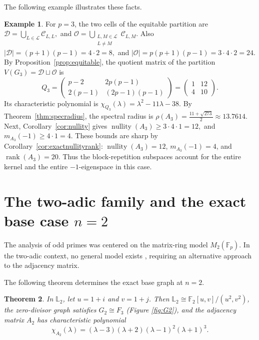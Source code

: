 \documentclass[12pt]{article}
\newtheorem{theorem}{Theorem}[section]
\theoremstyle{definition}
\newtheorem{example}[theorem]{Example}
\newcommand{\F}{\mathbb{F}}
\newcommand{\LL}{\mathbb{L}}
\newcommand{\calL}{\mathcal{L}}
\newcommand{\calD}{\mathcal{D}}
\newcommand{\calO}{\mathcal{O}}
\newcommand{\calC}{\mathcal{C}}
\newcommand{\rank}{\operatorname{rank}}
\newcommand{\nullity}{\operatorname{nullity}}
\begin{document}
	
	\medskip
	The following example illustrates these facts.
	\begin{example}\label{ex:p3spectral}
		For $p=3$, the two cells of the equitable partition are $\calD=\bigcup_{L\in\calL}\calC_{L,L},$ and $\calO=\bigcup_{\substack{L,M\in\calL\\L\neq M}}\calC_{L,M}.$  Also $|\calD|=(p+1)(p-1)=4\cdot 2=8,$ and $|\calO|=p(p+1)(p-1)=3\cdot 4\cdot 2=24.$ By Proposition~\ref{prop:equitable}, the quotient matrix of the partition
		$V(G_3)=\calD\sqcup \calO$ is
		$$
		Q_3=
		\begin{pmatrix}
			p-2 & 2p(p-1)\\[1mm]
			2(p-1) & (2p-1)(p-1)
		\end{pmatrix}
		=
		\begin{pmatrix}
			1&12\\
			4&10
		\end{pmatrix}.
		$$
		Its characteristic polynomial  is $\chi_{Q_3}(\lambda) 	=	\lambda^2-11\lambda-38.$  By Theorem~\ref{thm:specradius}, the spectral radius is  $\rho(A_3)=\tfrac{11+\sqrt{273}}{2}\approx 13.7614.$ 		
		Next, Corollary~\ref{cor:nullity} gives  $\nullity(A_3)\ge 3\cdot 4\cdot 1=12,$ and $m_{A_3}(-1)\ge 4\cdot 1=4.$ These bounds are sharp by Corollary~\ref{cor:exactnullityrank}: $\nullity(A_3)=12$, $m_{A_3}(-1)=4$, and $\rank(A_3)=20$. Thus the block-repetition subspaces account for the entire kernel and the entire $-1$-eigenspace in this case.
	\end{example}
	
	\section{The two-adic family and the exact base case $n=2$}\label{sec:twopower}
	
	The analysis of odd primes was centered on the matrix-ring model $M_2(\F_p)$. In the two-adic context, no general model exists \cite{grau2017}, requiring an alternative approach to the adjacency matrix.
	
	\medskip
	The following theorem determines the exact base graph at $n=2$.	
	\begin{theorem}\label{thm:n2}
		In $\LL_2$, let $u=1+i$ and $v=1+j$. Then $\LL_2\cong \F_2[u,v]/(u^2,v^2)$, the zero-divisor graph satisfies $G_2\cong F_3$ (Figure \ref{fig:G2}), and the adjacency matrix $A_2$ has characteristic polynomial
		$$
		\chi_{A_2}(\lambda)=(\lambda-3)(\lambda+2)(\lambda-1)^2(\lambda+1)^3.
		$$
	\end{theorem}
	
\end{document}
